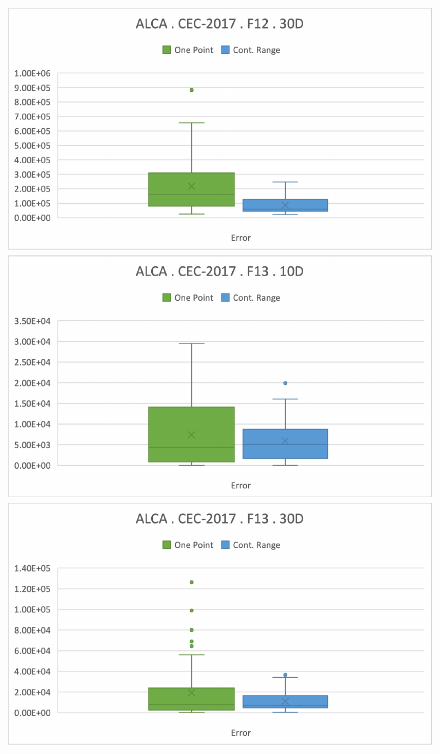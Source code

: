 \documentclass[graybox]{svmult}
\begin{document}
\begin{figure}[!ht]
\begin{minipage}[h]{0.49\linewidth}
        \end{minipage}
        \hfill
        \begin{minipage}[h]{0.49\linewidth}
            \includegraphics[width=1\linewidth]{img/fig_experiment_F12x30D.pdf} 
        \end{minipage}
        \vfill
        \vspace{0.05 cm}    
        \begin{minipage}[h]{0.49\linewidth}
            \includegraphics[width=1\linewidth]{img/fig_experiment_F13x10D.pdf} 
        \end{minipage}
        \hfill
        \begin{minipage}[h]{0.49\linewidth}
            \includegraphics[width=1\linewidth]{img/fig_experiment_F13x30D.pdf} 

\end{minipage}
\end{figure}
\end{document}
